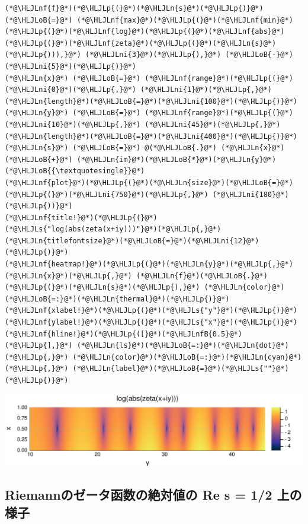 \documentclass[12pt,a4paper,xelatex,ja=standard]{bxjsarticle}
\newcommand{\HLJLn}[1]{#1}
\newcommand{\HLJLnf}[1]{\textcolor[RGB]{66,102,213}{#1}}
\newcommand{\HLJLs}[1]{\textcolor[RGB]{201,61,57}{#1}}
\newcommand{\HLJLnfB}[1]{\textcolor[RGB]{59,151,46}{#1}}
\newcommand{\HLJLni}[1]{\textcolor[RGB]{59,151,46}{#1}}
\newcommand{\HLJLoB}[1]{\textcolor[RGB]{102,102,102}{\textbf{#1}}}
\newcommand{\HLJLp}[1]{#1}
\begin{document}
\begin{lstlisting}
(*@\HLJLnf{f}@*)(*@\HLJLp{(}@*)(*@\HLJLn{s}@*)(*@\HLJLp{)}@*) (*@\HLJLoB{=}@*) (*@\HLJLnf{max}@*)(*@\HLJLp{(}@*)(*@\HLJLnf{min}@*)(*@\HLJLp{(}@*)(*@\HLJLnf{log}@*)(*@\HLJLp{(}@*)(*@\HLJLnf{abs}@*)(*@\HLJLp{(}@*)(*@\HLJLnf{zeta}@*)(*@\HLJLp{(}@*)(*@\HLJLn{s}@*)(*@\HLJLp{))),}@*) (*@\HLJLni{3}@*)(*@\HLJLp{),}@*) (*@\HLJLoB{-}@*)(*@\HLJLni{5}@*)(*@\HLJLp{)}@*)
(*@\HLJLn{x}@*) (*@\HLJLoB{=}@*) (*@\HLJLnf{range}@*)(*@\HLJLp{(}@*)(*@\HLJLni{0}@*)(*@\HLJLp{,}@*) (*@\HLJLni{1}@*)(*@\HLJLp{,}@*) (*@\HLJLn{length}@*)(*@\HLJLoB{=}@*)(*@\HLJLni{100}@*)(*@\HLJLp{)}@*)
(*@\HLJLn{y}@*) (*@\HLJLoB{=}@*) (*@\HLJLnf{range}@*)(*@\HLJLp{(}@*)(*@\HLJLni{10}@*)(*@\HLJLp{,}@*) (*@\HLJLni{45}@*)(*@\HLJLp{,}@*) (*@\HLJLn{length}@*)(*@\HLJLoB{=}@*)(*@\HLJLni{400}@*)(*@\HLJLp{)}@*)
(*@\HLJLn{s}@*) (*@\HLJLoB{=}@*) @(*@\HLJLoB{.}@*) (*@\HLJLn{x}@*) (*@\HLJLoB{+}@*) (*@\HLJLn{im}@*)(*@\HLJLoB{*}@*)(*@\HLJLn{y}@*)(*@\HLJLoB{{\textquotesingle}}@*)
(*@\HLJLnf{plot}@*)(*@\HLJLp{(}@*)(*@\HLJLn{size}@*)(*@\HLJLoB{=}@*)(*@\HLJLp{(}@*)(*@\HLJLni{750}@*)(*@\HLJLp{,}@*) (*@\HLJLni{180}@*)(*@\HLJLp{))}@*)
(*@\HLJLnf{title!}@*)(*@\HLJLp{(}@*)(*@\HLJLs{"log(abs(zeta(x+iy)))"}@*)(*@\HLJLp{,}@*) (*@\HLJLn{titlefontsize}@*)(*@\HLJLoB{=}@*)(*@\HLJLni{12}@*)(*@\HLJLp{)}@*)
(*@\HLJLnf{heatmap!}@*)(*@\HLJLp{(}@*)(*@\HLJLn{y}@*)(*@\HLJLp{,}@*) (*@\HLJLn{x}@*)(*@\HLJLp{,}@*) (*@\HLJLn{f}@*)(*@\HLJLoB{.}@*)(*@\HLJLp{(}@*)(*@\HLJLn{s}@*)(*@\HLJLp{),}@*) (*@\HLJLn{color}@*)(*@\HLJLoB{=:}@*)(*@\HLJLn{thermal}@*)(*@\HLJLp{)}@*)
(*@\HLJLnf{xlabel!}@*)(*@\HLJLp{(}@*)(*@\HLJLs{"y"}@*)(*@\HLJLp{)}@*)
(*@\HLJLnf{ylabel!}@*)(*@\HLJLp{(}@*)(*@\HLJLs{"x"}@*)(*@\HLJLp{)}@*)
(*@\HLJLnf{hline!}@*)(*@\HLJLp{([}@*)(*@\HLJLnfB{0.5}@*)(*@\HLJLp{],}@*) (*@\HLJLn{ls}@*)(*@\HLJLoB{=:}@*)(*@\HLJLn{dot}@*)(*@\HLJLp{,}@*) (*@\HLJLn{color}@*)(*@\HLJLoB{=:}@*)(*@\HLJLn{cyan}@*)(*@\HLJLp{,}@*) (*@\HLJLn{label}@*)(*@\HLJLoB{=}@*)(*@\HLJLs{""}@*)(*@\HLJLp{)}@*)
\end{lstlisting}


\begin{center}
\includegraphics[width=0.8\linewidth]{figures/テスト_6_1.pdf}
\end{center}

\subsection{Riemannのゼータ函数の絶対値の Re s = 1/2 上の様子}
\end{document}
